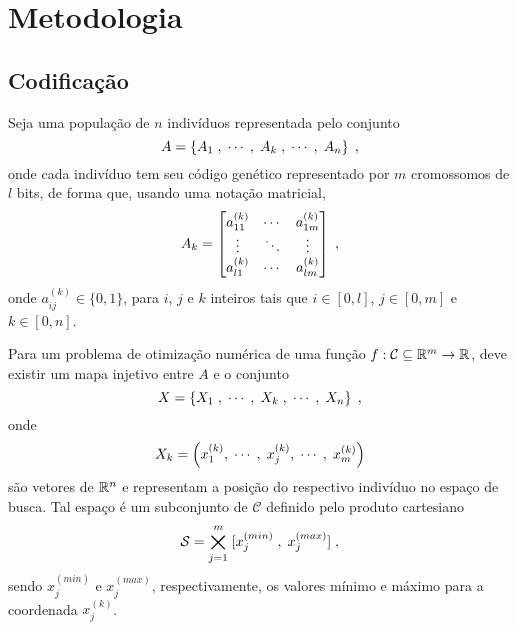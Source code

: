 \chapter{Metodologia}\label{cap_metodologia}

\section{Codificação}

\newcommand{\kth}[2]{{#1}^{(k)}_{#2}}
\newcommand{\kpth}[2]{{#1}^{(k + 1)}_{#2}}
\newcommand{\xmin}[1]{x^{(min)}_{#1}}
\newcommand{\xmax}[1]{x^{(max)}_{#1}}

Seja uma população de $n$ indivíduos representada pelo conjunto
\begin{equation}
  A = \left\{ A_1\;, \;\cdots\;,  \;A_k\;, \;\cdots\;, \;A_n \right\} \;\mathrm{,}
\end{equation}
onde cada indivíduo tem seu código genético representado por $m$ cromossomos
de $l$ bits, de forma que, usando uma notação matricial,
\begin{equation}
  A_k = \left[
    \begin{matrix}
      \kth{a}{11} & \cdots & \kth{a}{1m} \\
      \vdots      & \ddots & \vdots      \\
      \kth{a}{l1} & \cdots & \kth{a}{lm} \\
    \end{matrix}
    \right]
  \mathcomma
\end{equation}
onde $ \kth{a}{ij} \in \{0,1\} $, para $i$, $j$ e $k$ inteiros tais que
$ i \in \left[ 0, l \right] $, $ j \in \left[ 0, m \right] $ e $ k \in \left[ 0, n \right] $.

Para um problema de otimização numérica de uma função $ f : \mathcal{C} \subseteq \mathbb{R}^m \rightarrow \mathbb{R} $,
deve existir um mapa injetivo entre $A$ e o conjunto
\begin{equation}
  X = \left\{ X_1 \; , \;\cdots\;,  \; X_k \; , \;\cdots\;, \; X_n \right\} \;\mathrm{,}
\end{equation}
onde
\begin{equation}
  X_k = \left( \kth{x}{1}, \mathdots, \; \kth{x}{j}, \mathdots, \; \kth{x}{m} \right)
\end{equation}
são vetores de $ \mathbb{R}^n $ e representam a posição do respectivo indivíduo no espaço de busca.
Tal espaço é um subconjunto de $ \mathcal{C} $ definido pelo produto cartesiano
\begin{equation}
  \mathcal{S} = \bigtimes_{j = 1}^m \; [ \xmin{j} \; , \; \xmax{j} ] \mathcomma
\end{equation}
sendo $ \xmin{j} $ e $ \xmax{j} $, respectivamente, os valores mínimo e máximo para
a coordenada $ \kth{x}{j} $.

